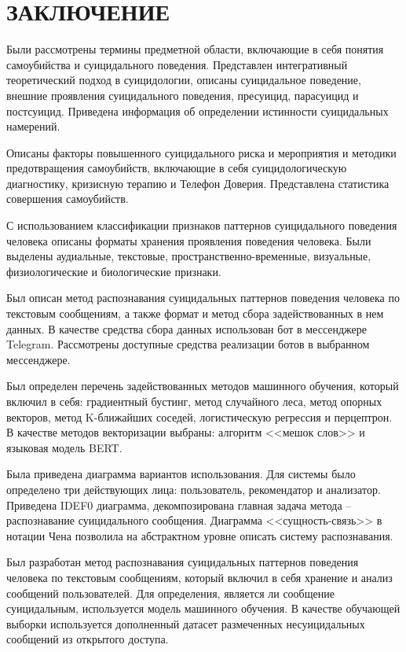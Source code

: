 \section*{ЗАКЛЮЧЕНИЕ}

Были рассмотрены термины предметной области, включающие в себя понятия самоубийства и суицидального поведения. 
Представлен интегративный теоретический подход в суицидологии, описаны суицидальное поведение, внешние проявления суицидального поведения, пресуицид, парасуицид и постсуицид. 
Приведена информация об определении истинности суицидальных намерений. 

Описаны факторы повышенного суицидального риска и мероприятия и методики предотвращения самоубийств, включающие в себя суицидологическую диагностику, кризисную терапию и Телефон Доверия.
Представлена статистика совершения самоубийств.

С использованием классификации признаков паттернов суицидального поведения человека описаны форматы хранения проявления поведения человека. 
Были выделены аудиальные, текстовые, пространственно-временные, визуальные, физиологические и биологические признаки.

Был описан метод распознавания суицидальных паттернов поведения человека по текстовым сообщениям, а также формат и метод сбора задействованных в нем данных. 
В качестве средства сбора данных использован бот в мессенджере Telegram. Рассмотрены доступные средства реализации ботов в выбранном мессенджере.

Был определен перечень задействованных методов машинного обучения, который включил в себя: градиентный бустинг, метод случайного леса, метод опорных векторов, метод K-ближайших соседей, логистическую регрессия и перцептрон. В качестве методов векторизации выбраны: алгоритм <<мешок слов>> и языковая модель BERT.

Была приведена диаграмма вариантов использования. Для системы было определено три действующих лица: пользователь, рекомендатор и анализатор. 
Приведена IDEF0 диаграмма, декомпозирована главная задача метода -- распознавание суицидального сообщения. 
Диаграмма <<сущность-связь>> в нотации Чена позволила на абстрактном уровне описать систему распознавания.

Был разработан метод распознавания суицидальных паттернов поведения человека по текстовым сообщениям, который включил в себя хранение и анализ сообщений пользователей.
Для определения, является ли сообщение суицидальным, используется модель машинного обучения. В качестве обучающей выборки используется дополненный датасет размеченных несуицидальных сообщений из открытого доступа.


